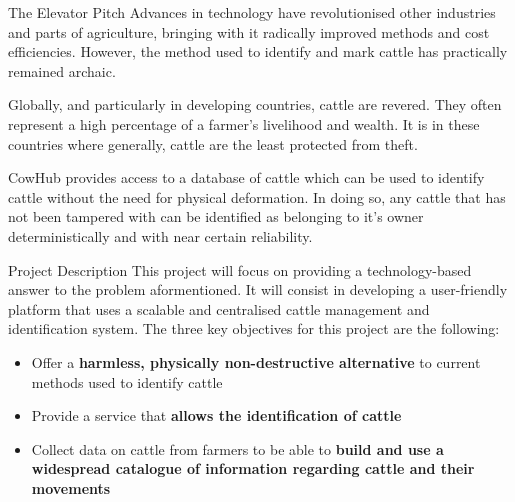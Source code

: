 

\begin{subsection}{The Elevator Pitch}
  Advances in technology have revolutionised other industries and parts of agriculture, bringing with it radically improved methods and cost efficiencies. However, the method used to identify and mark cattle has practically remained archaic.

  Globally, and particularly in developing countries, cattle are revered. They often represent a high percentage of a farmer's livelihood and wealth. It is in these countries where generally, cattle are the least protected from theft.

  CowHub provides access to a database of cattle which can be used to identify cattle without the need for physical deformation. In doing so, any cattle that has not been tampered with can be identified as belonging to it's owner deterministically and with near certain reliability.
\end{subsection}


\begin{subsection}{Project Description}
  This project will focus on providing a technology-based answer to the problem aformentioned. It will consist in developing a user-friendly platform that uses a scalable and centralised cattle management and identification system. The three key objectives for this project are the following:

  \begin{itemize}
  	\item Offer a \textbf{harmless, physically non-destructive alternative} to current methods used to identify cattle
  	\item Provide a service that \textbf{allows the identification of cattle}
  	\item Collect data on cattle from farmers to be able to \textbf{build and use a widespread catalogue of information regarding cattle and their movements}
  \end{itemize}

\end{subsection}

